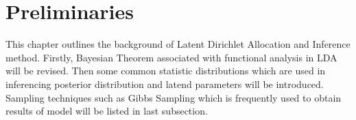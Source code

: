 \chapter{Preliminaries}
This chapter outlines the background of Latent Dirichlet Allocation and Inference method. Firstly, Bayesian Theorem associated with functional analysis in LDA will be revised. Then some common statistic distributions which are used in inferencing posterior distribution and latend parameters will be introduced. Sampling techniques such as Gibbs Sampling which is frequently used to obtain results of model will be listed in last subsection.
